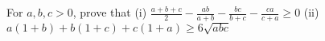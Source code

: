 For $a,b,c>0$, prove that
(i) $\frac{a+b+c}{2}-\frac{ab}{a+b}-\frac{bc}{b+c}-\frac{ca}{c+a}\ge 0$
(ii) $a(1+b)+b(1+c)+c(1+a)\ge 6\sqrt{abc}$